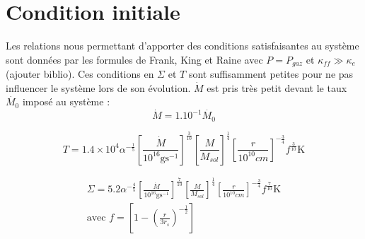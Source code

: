\section{Condition initiale}
Les relations nous permettant d'apporter des conditions satisfaisantes au système sont données par les formules de Frank, King et Raine avec $P = P_{gaz}$ et $\kappa_{ff} \gg \kappa_{e}$(ajouter biblio). Ces conditions en $\Sigma$ et $T$ sont suffisamment petites pour ne pas influencer le système lors de son évolution. $\dot{M}$ est pris très petit devant  le taux $\dot{M_{0}}$ imposé au système : 
\begin{equation}
	\dot{M} = 1.10^{-1 }\dot{M_{0}}
\end{equation} 

\begin{equation}
	T = 1.4 \times 10^{4} \alpha^{- \frac{1}{5}} \left[ \frac{\dot{M}}{10^{16} \mbox{g} \mbox{s}^{-1}} \right]^{\frac{3}{10}} \left[ \frac{M}{M_{sol}}\right]^{\frac{1}{4}} \left[ \frac{r}{10^{10} cm}\right]^{- \frac{3}{4}} f^{\frac{3}{10}} \mbox{K} 
\end{equation}

\begin{align}
	\Sigma = 5.2 \alpha^{- \frac{4}{5}} \left[ \frac{\dot{M}}{10^{16} \mbox{g} \mbox{s}^{-1}} \right]^{\frac{7}{10}} \left[ \frac{M}{M_{sol}}\right]^{\frac{1}{4}} \left[ \frac{r}{10^{10} cm}\right]^{- \frac{3}{4}} f^{\frac{7}{10}} \mbox{K}  \\ 
	\text{avec } f = \left[ 1 - \left( \frac{r}{3 r_{s}}\right)^{- \frac{1}{2}}\right]
\end{align}

